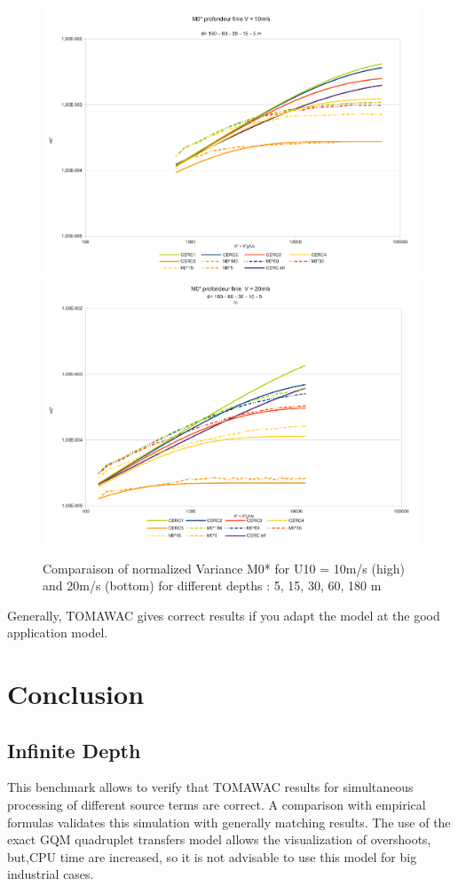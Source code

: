 \documentclass[10pt]{article}
\begin{document}
\begin{figure}
\centering
\includegraphics[scale=0.4]{m0_test7v10.pdf}\\
\includegraphics[scale=0.4]{m0_test7v20.pdf}\\
\caption{Comparaison of normalized Variance M0* for U10 = 10m/s (high) and 20m/s (bottom) for different depths : 5, 15, 30, 60, 180 m}
\end{figure}
Generally, TOMAWAC gives correct results if you adapt the model at the good application model.
\section{Conclusion}
\subsection*{Infinite Depth}
This benchmark allows to verify that TOMAWAC results for simultaneous processing of different source terms are correct. A comparison with empirical formulas validates this simulation with generally matching results. The use of the exact GQM quadruplet transfers model allows the visualization of overshoots, but,CPU time are increased, so it is not advisable to use this model for big industrial cases.
\end{document}
